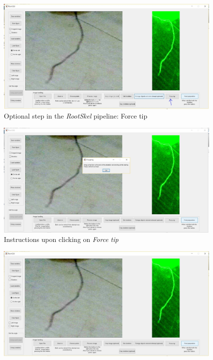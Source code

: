 \begin{figure}[H]
	\centering
	\includegraphics[width=\textwidth]{../Figures/manual/optionalB1.jpg}
	\caption{Optional step in the \textit{RootSkel} pipeline: Force tip}
	\label{fig:img37}
\end{figure}

\begin{figure}[H]
	\centering
	\includegraphics[width=\textwidth]{../Figures/manual/optionalB2.jpg}
	\caption{Instructions upon clicking on \textit{Force tip}}
	\label{fig:img38}
\end{figure}

\begin{figure}[H]
	\centering
	\includegraphics[width=\textwidth]{../Figures/manual/optionalB3.jpg}
	\label{fig:img39}
\end{figure}

